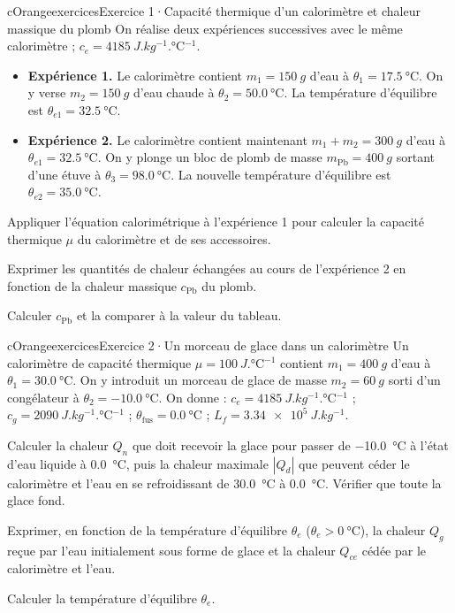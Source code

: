 \documentclass[11pt,a4paper]{article}
\newcommand{\tfus}{\theta_{\mathrm{fus}}}
\newcommand{\dC}[1]{\qty{#1}{\degreeCelsius}}
\begin{document}
\begin{rub}[unbreakable]{cOrange}{exercices}{Exercice 1\enspace·\enspace Capacité thermique d’un calorimètre et chaleur massique du plomb}
On réalise deux expériences successives avec le même calorimètre ; $c_e = \qty{4185}{J.kg^{-1}.\degreeCelsius^{-1}}$.
\begin{itemize}
  \item \textbf{Expérience 1.} Le calorimètre contient $m_1 = \qty{150}{g}$ d’eau à $\theta_1 = \dC{17,5}$. On y verse $m_2 = \qty{150}{g}$ d’eau chaude à $\theta_2 = \dC{50,0}$. La température d’équilibre est $\theta_{e1} = \dC{32,5}$.
  \item \textbf{Expérience 2.} Le calorimètre contient maintenant $m_1 + m_2 = \qty{300}{g}$ d’eau à $\theta_{e1} = \dC{32,5}$. On y plonge un bloc de plomb de masse $m_{\mathrm{Pb}} = \qty{400}{g}$ sortant d’une étuve à $\theta_3 = \dC{98,0}$. La nouvelle température d’équilibre est $\theta_{e2} = \dC{35,0}$.
\end{itemize}
\begin{exq}
  \item Appliquer l’équation calorimétrique à l’expérience 1 pour calculer la capacité thermique $\mu$ du calorimètre et de ses accessoires.
  \item Exprimer les quantités de chaleur échangées au cours de l’expérience 2 en fonction de la chaleur massique $c_{\mathrm{Pb}}$ du plomb.
  \item Calculer $c_{\mathrm{Pb}}$ et la comparer à la valeur du tableau.
\end{exq}
\end{rub}

\begin{rub}[unbreakable]{cOrange}{exercices}{Exercice 2\enspace·\enspace Un morceau de glace dans un calorimètre}
Un calorimètre de capacité thermique $\mu = \qty{100}{J.\degreeCelsius^{-1}}$ contient $m_1 = \qty{400}{g}$ d’eau à $\theta_1 = \dC{30,0}$. On y introduit un morceau de glace de masse $m_2 = \qty{60}{g}$ sorti d’un congélateur à $\theta_2 = \dC{-10,0}$. On donne : $c_e = \qty{4185}{J.kg^{-1}.\degreeCelsius^{-1}}$ ; $c_g = \qty{2090}{J.kg^{-1}.\degreeCelsius^{-1}}$ ; $\tfus = \dC{0,0}$ ; $L_f = \qty{3,34e5}{J.kg^{-1}}$.
\begin{exq}
  \item Calculer la chaleur $Q_n$ que doit recevoir la glace pour passer de \dC{-10,0} à l’état d’eau liquide à \dC{0,0}, puis la chaleur maximale $|Q_d|$ que peuvent céder le calorimètre et l’eau en se refroidissant de \dC{30,0} à \dC{0,0}. Vérifier que toute la glace fond.
  \item Exprimer, en fonction de la température d’équilibre $\theta_e$ ($\theta_e > \dC{0}$), la chaleur $Q_g$ reçue par l’eau initialement sous forme de glace et la chaleur $Q_{ce}$ cédée par le calorimètre et l’eau.
  \item Calculer la température d’équilibre $\theta_e$.
\end{exq}
\end{rub}
\end{document}

